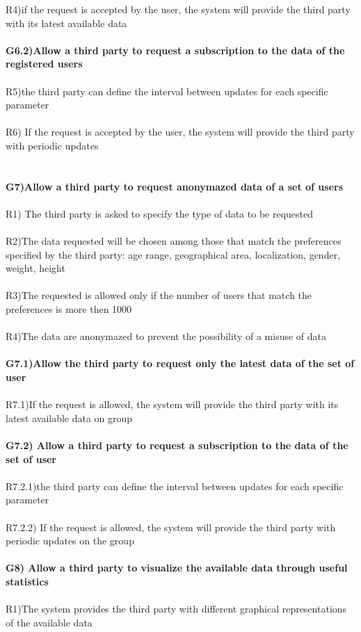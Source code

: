 R4)if the request is accepted by the user, the system will provide the third party with its latest available data \\ \\ 
\textbf{G6.2)Allow a third party to request a subscription to the data of the registered users} \\ \\
R5)the third party can define the interval between updates for each specific parameter \\ \\
R6) If the request is accepted by the user, the system will provide the third party with periodic updates \\ \\ \\
\textbf{G7)Allow a third party to request anonymazed data of a set of users} \\ \\
R1) The third party is asked to specify the type of data to be requested \\ \\
 R2)The data requested will be chosen among those that match the preferences specified by the third party: age range, geographical area, localization, gender, weight, height \\ \\
R3)The requested is allowed only if the number of users that match the preferences is more then 1000 \\ \\
R4)The data are anonymazed to prevent the possibility of a misuse of data \\ \\ 
\textbf{G7.1)Allow the third party to request only the latest data of the set of user} \\ \\
R7.1)If the request is allowed, the system will provide the third party with its latest available data on group \\ \\
\textbf{G7.2) Allow a third party to request a subscription to the data of the set of user} \\ \\
R7.2.1)the third party can define the interval between updates for each specific parameter \\ \\
R7.2.2) If the request is allowed, the system will provide the third party with periodic updates on the group \\ \\ 
\textbf{G8) Allow a third party to visualize the available data through useful statistics} \\ \\
R1)The system provides the third party with different graphical representations of the available data \\ \\

